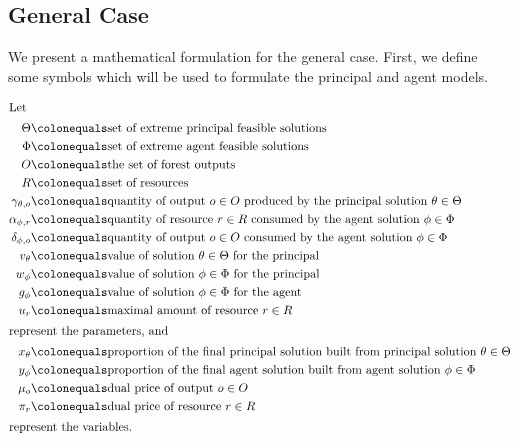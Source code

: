 \subsection{General Case}

We present a mathematical formulation for the general case. First, we define some symbols which will be used to formulate the principal and agent models.

\begin{align*}
\intertext{Let}
\Theta &\colonequals  \text{set of extreme principal feasible solutions}\\
\Phi &\colonequals  \text{set of extreme agent feasible solutions}\\
O &\colonequals \text{the set of forest outputs}\\
R &\colonequals \text{set of resources}\\
\gamma_{\theta,o} &\colonequals \text{quantity of output $o \in O$ produced by the principal solution $\theta \in \Theta$}\\
\alpha_{\phi,r} &\colonequals \text{quantity of resource $r \in R$ consumed by the agent solution $\phi \in \Phi$}\\
\delta_{\phi,o} &\colonequals \text{quantity of output $o \in O$ consumed by the agent solution $\phi \in \Phi$}\\
v_{\theta} &\colonequals \text{value of solution $\theta \in \Theta$ for the principal}\\
w_{\phi} &\colonequals \text{value of solution $\phi \in \Phi$ for the principal}\\
g_{\phi} &\colonequals \text{value of solution $\phi \in \Phi$ for the agent}\\
u_r &\colonequals \text{maximal amount of resource $r \in R$}\\
\intertext{represent the parameters, and}
 x_{\theta} &\colonequals \text{proportion of the final principal solution built from principal solution $\theta \in \Theta$}\\
y_{\phi} &\colonequals \text{proportion of the final agent solution built from agent solution $\phi \in \Phi$}\\
\mu_o &\colonequals \text{dual price of output $o \in O$}\\
\pi_r &\colonequals \text{dual price of resource $r \in R$}\\
\intertext{represent the variables.}
\end{align*}

